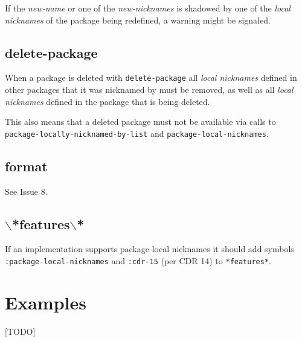 \documentclass[11pt]{article}
\begin{document}
If the \emph{new-name} or one of the \emph{new-nicknames} is shadowed by one of the \emph{local
nicknames} of the package being redefined, a warning might be signaled.
\subsection{delete-package}
\label{sec:org25b8ea2}
When a package is deleted with \texttt{delete-package} all \emph{local nicknames} defined in
other packages that it was nicknamed by must be removed, as well as all \emph{local
nicknames} defined in the package that is being deleted.

This also means that a deleted package must not be available via calls to
\texttt{package-locally-nicknamed-by-list} and \texttt{package-local-nicknames}.
\subsection{format}
\label{sec:org1368135}
See Issue 8.
\subsection{$\backslash$*features$\backslash$*}
\label{sec:org46ec4b8}
If an implementation supports package-local nicknames it should add symbols
\texttt{:package-local-nicknames} and \texttt{:cdr-15} (per CDR 14) to \texttt{*features*}.
\section{Examples}
\label{sec:orgc8868b7}
[TODO]
\end{document}
